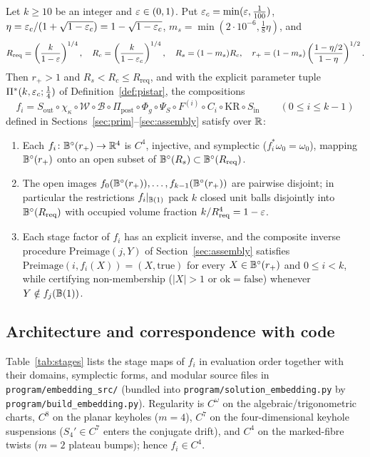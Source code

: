 \begin{theorem}\label{thm:main}
Let $k\ge10$ be an integer and $\varepsilon\in(0,1)$. Put $\varepsilon_c=\min(\varepsilon,\frac1{100})$,
$\eta=\varepsilon_c/(1+\sqrt{1-\varepsilon_c})=1-\sqrt{1-\varepsilon_c}$, $m_s=\min(2\cdot10^{-6},\frac18\eta)$, and
\[
 R_{\mathrm{req}}=\left(\frac{k}{1-\varepsilon}\right)^{1/4},\quad
 R_c=\left(\frac{k}{1-\varepsilon_c}\right)^{1/4},\quad
 R_s=(1-m_s)R_c,\quad
 r_+=(1-m_s)\left(\frac{1-\eta/2}{1-\eta}\right)^{1/2}.
\]
Then $r_+>1$ and $R_s<R_c\le R_{\mathrm{req}}$, and with the explicit parameter tuple $\Pi^*(k,\varepsilon_c;\frac14)$ of
Definition~\ref{def:pistar}, the compositions
\[
 f_i = S_{\mathrm{out}}\circ\chi_\kappa\circ\mathcal W\circ\mathcal B\circ\Pi_{\mathrm{post}}
       \circ\Phi_g\circ\Psi_S\circ F^{(i)}\circ C_i\circ\mathrm{KR}\circ S_{\mathrm{in}}
 \qquad(0\le i\le k-1)
\]
defined in Sections~\ref{sec:prim}--\ref{sec:assembly} satisfy over $\mathbb{R}$:
\begin{enumerate}[label=(\roman*)]
\item Each $f_i\colon\mathbb{B}^{\circ}(r_+)\to\mathbb{R}^4$ is $C^4$, injective, and symplectic ($f_i^*\omega_0=\omega_0$), mapping
$\mathbb{B}^{\circ}(r_+)$ onto an open subset of $\mathbb{B}^{\circ}(R_s)\subset\mathbb{B}^{\circ}(R_{\mathrm{req}})$.
\item The open images $f_0(\mathbb{B}^{\circ}(r_+)),\dots,f_{k-1}(\mathbb{B}^{\circ}(r_+))$ are pairwise disjoint; in particular the
restrictions $f_i|_{\mathbb{B}(1)}$ pack $k$ closed unit balls disjointly into $\mathbb{B}^{\circ}(R_{\mathrm{req}})$ with occupied
volume fraction $k/R_{\mathrm{req}}^4=1-\varepsilon$.
\item Each stage factor of $f_i$ has an explicit inverse, and the composite inverse procedure
$\mathrm{Preimage}(j,Y)$ of Section~\ref{sec:assembly} satisfies $\mathrm{Preimage}(i,f_i(X))=(X,\mathrm{true})$ for
every $X\in\mathbb{B}^{\circ}(r_+)$ and $0\le i<k$, while certifying non-membership ($|X|>1$ or $\mathrm{ok}=\mathrm{false}$)
whenever $Y\notin f_j(\mathbb{B}(1))$.
\end{enumerate}
\end{theorem}

\subsection{Architecture and correspondence with code}\label{sec:intro-arch}

Table~\ref{tab:stages} lists the stage maps of $f_i$ in evaluation order together with their domains, symplectic forms,
and modular source files in \texttt{program/embedding\_src/} (bundled into \texttt{program/solution\_embedding.py} by
\texttt{program/build\_embedding.py}). Regularity is $C^\omega$ on the algebraic/trigonometric charts, $C^8$ on the
planar keyholes ($m=4$), $C^7$ on the four-dimensional keyhole suspensions ($S_4'\in C^7$ enters the conjugate drift),
and $C^4$ on the marked-fibre twists ($m=2$ plateau bumps); hence $f_i\in C^4$.

